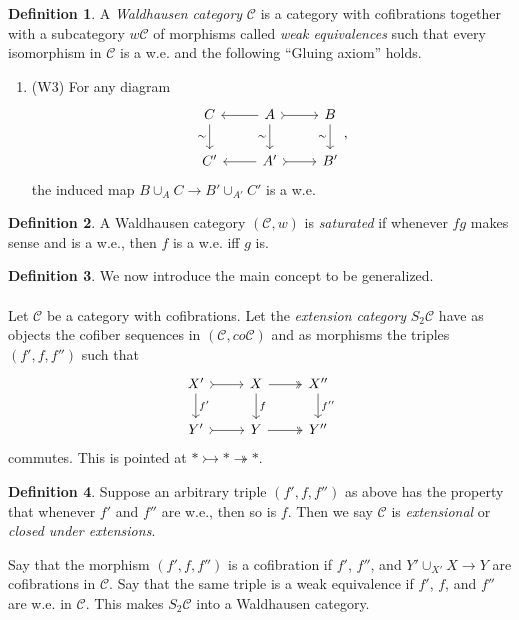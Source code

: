 \documentclass[10pt,letterpaper,cm]{nupset}
\theoremstyle{definition}
\newtheorem{definition}{Definition}
\theoremstyle{theorem}
\theoremstyle{remark}
\newcommand{\1}{\mathbf{1}}
\renewcommand{\c}{\mathscr{C}}
\newcommand{\0}{\vec 0}
\begin{document}
\begin{definition}
A \textit{Waldhausen category} $\c$ is a category with cofibrations together with a subcategory $w\c$ of morphisms called \textit{weak equivalences} such that every isomorphism in $\c$ is a w.e. and the following ``Gluing axiom'' holds.
\begin{enumerate}
\item (W3) For any diagram
\[
\begin{tikzcd}
C \arrow[d, "\sim"'] & A \arrow[d, "\sim"'] \arrow[r, tail] \arrow[l] & B \arrow[d, "\sim"'] \\
C' & A' \arrow[r, tail] \arrow[l] & B'
\end{tikzcd}, \]
the induced map $B \cup_A C \to  B' \cup_{A'} C'$ is a w.e.
\end{enumerate}
\end{definition}

\begin{definition}
A Waldhausen category $(\c, w)$ is \textit{saturated} if whenever $fg$ makes sense and is a w.e., then $f$ is a w.e. iff $g$ is. 
\end{definition}

\begin{definition}
We now introduce the main concept to be generalized.
\\ \\ Let $\c$ be a category with cofibrations. Let the \textit{extension category} $S_2\c$ have as objects the cofiber sequences in $(\c, co\c)$ and as morphisms the triples $(f', f, f'')$ such that
\[
\begin{tikzcd}
X' \arrow[r, tail] \arrow[d, "f'"] & X \arrow[r, two heads] \arrow[d, "f"] & X'' \arrow[d, "f''"] \\
Y' \arrow[r, tail] & Y \arrow[r, two heads] & Y''
\end{tikzcd}
\] 
commutes. This is pointed at $\ast \rightarrowtail \ast \twoheadrightarrow \ast$.
\end{definition}

\begin{definition}
Suppose an arbitrary triple $(f', f, f'')$ as above has the property that whenever $f'$ and $f''$ are w.e., then so is $f$. Then we say $\c$ is \textit{extensional} or \textit{closed under extensions}.
\end{definition}


Say that the morphism $(f', f, f'')$ is a cofibration if $f'$, $f''$, and $Y' \cup_{X'} X \to Y$ are cofibrations in $\c$. Say that  the same triple is a weak equivalence if $f'$, $f$, and $f''$ are w.e. in $\c$. This makes $S_2 \c$ into a Waldhausen category.
\end{document}
